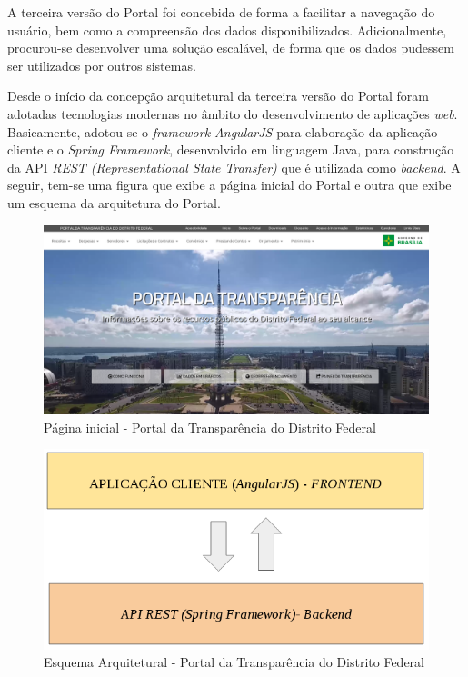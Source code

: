A terceira versão do Portal foi concebida de forma a facilitar a navegação do usuário, bem como a compreensão dos dados disponibilizados. Adicionalmente, procurou-se desenvolver uma solução escalável, de forma que os dados pudessem ser utilizados por outros sistemas.

Desde o início da concepção arquitetural da terceira versão do Portal foram adotadas tecnologias modernas no âmbito do desenvolvimento de aplicações \textit{web}. Basicamente, adotou-se o \textit{framework AngularJS} para elaboração da aplicação cliente e o \textit{Spring Framework}, desenvolvido em linguagem Java, para construção da API \textit{REST (Representational State Transfer)} que é utilizada como \textit{backend}. A seguir, tem-se uma figura que exibe a página inicial do Portal e outra que exibe um esquema da arquitetura do Portal.

\begin{figure}[h]
\includegraphics[width=\textwidth]{figuras/portalTransparencia.png}
\caption{Página inicial - Portal da Transparência do Distrito Federal}
\end{figure}

\begin{figure}[h]
\includegraphics[width=\textwidth]{figuras/arquiteturaPortal.png}
\caption{Esquema Arquitetural - Portal da Transparência do Distrito Federal}
\end{figure}

